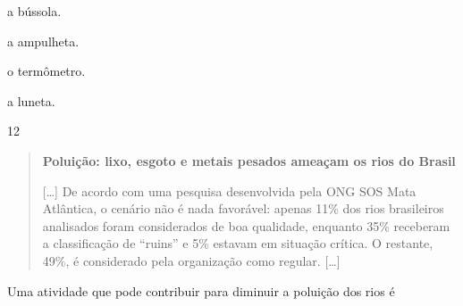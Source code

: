 \begin{minipage}{0.5\textwidth}
\begin{escolha}
\item a bússola.

\item a ampulheta.

\item o termômetro.

\item a luneta.
\end{escolha}
\end{minipage}


\num{12}

\begin{quote}
\textbf{Poluição: lixo, esgoto e metais pesados ameaçam os rios do
Brasil}

{[}\ldots{}{]}
De acordo com uma pesquisa desenvolvida pela ONG SOS Mata Atlântica, o
cenário não é nada favorável: apenas 11\% dos rios brasileiros
analisados foram considerados de boa qualidade, enquanto 35\% receberam
a classificação de “ruins” e 5\% estavam em situação crítica. O
restante, 49\%, é considerado pela organização como regular. {[}\ldots{}{]}

\end{quote}

Uma atividade que pode contribuir para diminuir a poluição dos rios é

